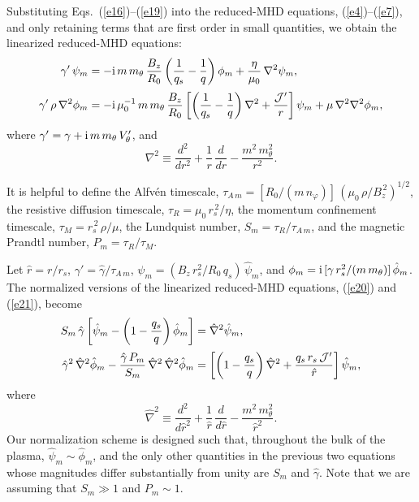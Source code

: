 \documentclass[12pt,prb,aps]{revtex4-1}
\begin{document}
Substituting Eqs.~(\ref{e16})--(\ref{e19}) into the
reduced-MHD equations, (\ref{e4})--(\ref{e7}), and only
retaining terms that are first order in small
quantities, we obtain the  linearized reduced-MHD equations:
\begin{align}\label{e20}
\gamma'\,\psi_m&= -{\rm i}\,m\,m_\theta\,\frac{B_z}{R_0}\left(\frac{1}{q_s}-\frac{1}{q}\right)\phi_m  + \frac{\eta}{\mu_0}
\,\nabla^2 \psi_m,\\[0.5ex]
\gamma'\,\rho\,\nabla^2\phi_m&= -{\rm i}\,\mu_0^{-1}\,m\,m_\theta\,\frac{B_z}{R_0}\left[\left(\frac{1}{q_s}-\frac{1}{q}\right)\nabla^2+\frac{{\cal J}'}{r}\right]\psi_m+\mu\,\nabla^2\nabla^2\phi_m,\label{e21}
\end{align}
where $\gamma' = \gamma + {\rm i}\,m\,m_\theta\,V_\theta'$,
and
\begin{equation}
\nabla^2 \equiv \frac{d^2}{dr^2} + \frac{1}{r}\,\frac{d}{dr} - \frac{m^2\,m_\theta^2}{r^2}.
\end{equation}

It is helpful to define the Alfv\'{e}n timescale, 
$\tau_{A\,m} = [R_0/(m\,n_\varphi)]\,(\mu_0\,\rho/B_z^{\,2})^{1/2}$, 
the resistive diffusion timescale,
$\tau_R = \mu_0\,r_s^{\,2}/\eta$,
the momentum confinement timescale,
$\tau_M =r_s^{\,2}\,\rho/\mu$,
 the Lundquist number,
$S_m = \tau_R/\tau_{A\,m}$,
and the magnetic Prandtl number,
$P_m =\tau_R/\tau_M$.

Let $\hat{r}=r/r_s$, $\gamma'= \hat{\gamma}/\tau_{A\,m}$, 
$\psi_m = (B_z\,r_s^2/R_0\,q_s)\,\hat{\psi}_m$, and
$\phi_m = {\rm i}\,[\gamma\,r_s^2/(m\,m_\theta)]\,\hat{\phi}_m$. The normalized versions of the
linearized reduced-MHD equations, (\ref{e20}) and (\ref{e21}), become
\begin{align}
S_m\,\hat{\gamma}\left[\hat{\psi}_m - \left(1-\frac{q_s}{q}\right)\hat{\phi}_m\right]
&= \hat{\nabla}^2\hat{\psi}_m,\label{e9.27}\\[0.5ex]
\hat{\gamma}^2\,\hat{\nabla}^2\hat{\phi}_m- \frac{\hat{\gamma}\,P_m}{S_m}\,\hat{\nabla}^2\,\hat{\nabla}^2\hat{\phi}_m&= 
\left[\left(1-\frac{q_s}{q}\right)\hat{\nabla}^2+\frac{q_s\,r_s\,{\cal J}'}{\hat{r}}\right]\hat{\psi}_m,\label{e9.28}
\end{align}
where 
\begin{equation}
\hat{\nabla}^2\equiv \frac{d^2}{d\hat{r}^2}+\frac{1}{\hat{r}}\,\frac{d}{d\hat{r}}-\frac{m^2\,m_\theta^2}{\hat{r}^2}.
\end{equation}
Our normalization scheme is designed such that, throughout the bulk of the plasma, $\hat{\psi}_m\sim \hat{\phi}_m$, and the only other quantities in the previous two equations whose magnitudes differ substantially from unity are $S_m$ and $\hat{\gamma}$.
Note that we are assuming that $S_m\gg 1$ and $P_m\sim 1$.
\end{document}
